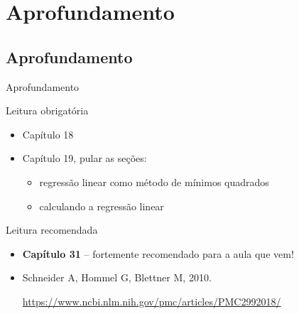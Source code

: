 \documentclass{beamer}
\begin{document}
\section{Aprofundamento}

\subsection{Aprofundamento}

\begin{frame}{Aprofundamento}
  \begin{block}{Leitura obrigatória}
    \begin{itemize}
      \footnotesize
    \item Capítulo 18
    \item Capítulo 19, pular as seções:
      \begin{itemize}
        \scriptsize
      \item regressão linear como método de mínimos quadrados
      \item calculando a regressão linear
      \end{itemize}
    \end{itemize}
  \end{block}
  \begin{block}{Leitura recomendada}
    \small
    
    \begin{itemize}
      \scriptsize
    \item {\bf Capítulo 31} -- {\tiny fortemente recomendado para a aula que vem!}
    \item Schneider A, Hommel G, Blettner M, 2010.

      \url{https://www.ncbi.nlm.nih.gov/pmc/articles/PMC2992018/}

    \end{itemize}
  \end{block}
\end{frame}
\end{document}
